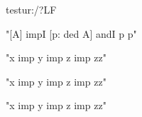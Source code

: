 \documentclass{article}
\begin{document}

\begin{mmttheory}{test}{ur:/?LF}


"[A] impI [p: ded A] andI p p"

\begin{mmtcontext}


\begin{mmtcontext}
"x imp y imp z imp zz"
\end{mmtcontext}

"x imp y imp z imp zz"

\end{mmtcontext}
"x imp y imp z imp zz"

\end{mmttheory}
\end{document}
